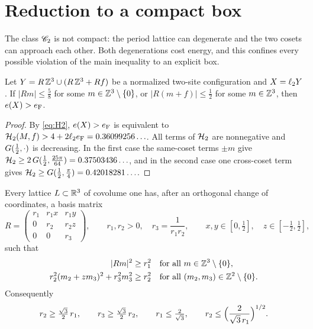\section{Reduction to a compact box}\label{sec:reduction}

The class $\mathscr C_2$ is not compact: the period lattice can degenerate and the two cosets can approach each other. Both degenerations
cost energy, and this confines every possible violation of the main inequality to an explicit box.

\begin{lemma}[Separation]\label{lem:separation}
Let $Y=R\,\mathbb Z^3\cup(R\,\mathbb Z^3+Rf)$ be a normalized two-site configuration and $X=\ell_2 Y$. If $|Rm|\le\frac58$ for some
$m\in\mathbb Z^3\setminus\{0\}$, or $|R(m+f)|\le\frac12$ for some $m\in\mathbb Z^3$, then $e(X)>e_{\mathrm F}$.
\end{lemma}

\begin{proof}
By \eqref{eq:H2}, $e(X)>e_{\mathrm F}$ is equivalent to $\mathcal H_2(M,f)>4+2\ell_2e_{\mathrm F}=0.36099256\ldots$. All terms of $\mathcal H_2$ are nonnegative
and $G(\frac12,\cdot)$ is decreasing. In the first case the same-coset terms $\pm m$ give
$\mathcal H_2\ge2\,G(\frac12,\frac{25\pi}{64})=0.37503436\ldots$, and in the second case one cross-coset term gives
$\mathcal H_2\ge G(\frac12,\frac\pi4)=0.42018281\ldots$.
\end{proof}

\begin{lemma}\label{lem:reduced}
Every lattice $L\subset\mathbb R^3$ of covolume one has, after an orthogonal change of coordinates, a basis matrix
\begin{equation}\label{eq:Rchart}
  R=\begin{pmatrix}r_1&r_1x&r_1y\\0&r_2&r_2z\\0&0&r_3\end{pmatrix},\qquad r_1,r_2>0,\quad r_3=\frac1{r_1r_2},\qquad
  x,y\in[0,\tfrac12],\quad z\in[-\tfrac12,\tfrac12],
\end{equation}
such that
\begin{align}
  |Rm|^2&\ge r_1^2 &&\text{for all }m\in\mathbb Z^3\setminus\{0\},\label{eq:R1}\\
  r_2^2(m_2+zm_3)^2+r_3^2m_3^2&\ge r_2^2 &&\text{for all }(m_2,m_3)\in\mathbb Z^2\setminus\{0\}.\label{eq:R2}
\end{align}
Consequently
\begin{equation}\label{eq:R3}
  r_2\ge\tfrac{\sqrt3}2\,r_1,\qquad r_3\ge\tfrac{\sqrt3}2\,r_2,\qquad r_1\le\tfrac2{\sqrt3},\qquad r_2\le\Bigl(\frac2{\sqrt3\,r_1}\Bigr)^{1/2}.
\end{equation}
\end{lemma}

